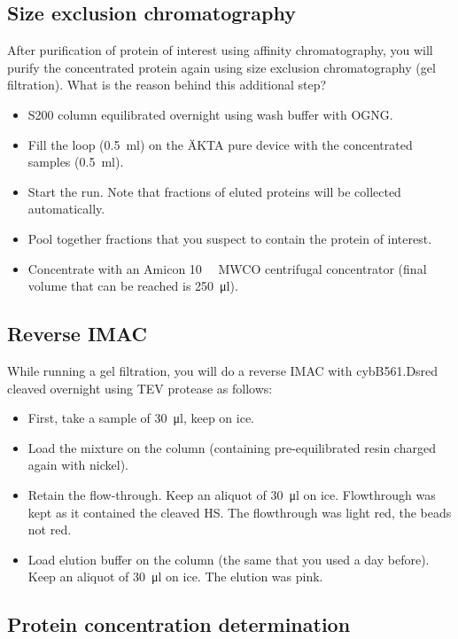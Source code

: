 \subsection{Size exclusion chromatography}

After purification of protein of interest using affinity chromatography, you will purify the concentrated protein again using size exclusion chromatography (gel filtration). What is the reason behind this additional step?

\begin{itemize}
	\item S200 column equilibrated overnight using wash buffer with OGNG.
	\item Fill the loop (\SI{0.5}{\ml}) on the ÄKTA pure device with the
		concentrated samples (\SI{0.5}{\ml}).
	\item Start the run. Note that fractions of eluted proteins will be
		collected automatically.
	\item Pool together fractions that you suspect to contain the protein
		of interest.
	\item Concentrate with an Amicon \SI{10}{\kilo\Da} MWCO centrifugal
		concentrator (final volume that can be reached is
		\SI{250}{\ul}).
\end{itemize}

\subsection{Reverse IMAC}

While running a gel filtration, you will do a reverse IMAC with cybB561.Dsred
cleaved overnight using TEV protease as follows:

\begin{itemize}
	\item First, take a sample of \SI{30}{\ul}, keep on ice.
	\item Load the mixture on the column (containing pre-equilibrated resin
		charged again with nickel).
	\item Retain the flow-through. Keep an aliquot of \SI{30}{\ul} on ice.
		Flowthrough was kept as it contained the cleaved HS. The
		flowthrough was light red, the beads not red.
	\item Load elution buffer on the column (the same that you used a day
		before). Keep an aliquot of \SI{30}{\ul} on ice. The elution
		was pink.
\end{itemize}

\subsection{Protein concentration determination}

